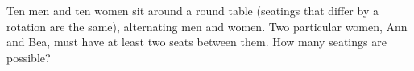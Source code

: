 Ten men and ten women sit around a round table (seatings that differ by a rotation are the same), alternating men and women. Two particular women, Ann and Bea, must have at least two seats between them. How many seatings are possible?
